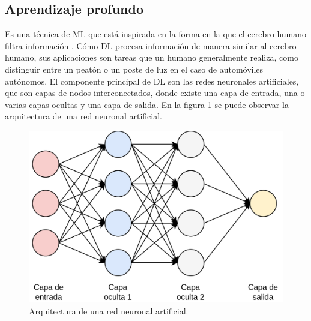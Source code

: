 \subsection{Aprendizaje profundo}
Es una técnica de ML que está inspirada en la forma en la que el cerebro humano filtra información \cite{dl_def}. Cómo DL procesa información de manera similar al cerebro humano, sus aplicaciones son tareas que un humano generalmente realiza, como distinguir entre un peatón o un poste de luz en el caso de automóviles autónomos. El componente principal de DL son las redes neuronales artificiales, que son capas de nodos interconectados, donde existe una capa de entrada, una o varias capas ocultas y una capa de salida. En la figura \ref{fig:dl_nn} se puede observar la arquitectura de una red neuronal artificial.
\begin{figure}[h]
	\centering
	\includegraphics[scale=0.25]{./Figures/dl_nn.png}
	\caption{Arquitectura de una red neuronal artificial.}
	\label{fig:dl_nn}
\end{figure}


